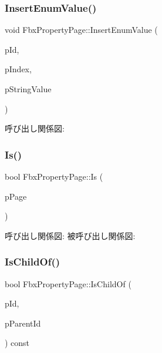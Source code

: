\subsubsection{\texorpdfstring{Insert\+Enum\+Value()}{InsertEnumValue()}}
{\footnotesize\ttfamily void Fbx\+Property\+Page\+::\+Insert\+Enum\+Value (\begin{DoxyParamCaption}\item[{\hyperlink{fbxtypes_8h_a088fa96de3b0b3ea69f0f6afef525dfb}{Fbx\+Int}}]{p\+Id,  }\item[{int}]{p\+Index,  }\item[{const char $\ast$}]{p\+String\+Value }\end{DoxyParamCaption})}

呼び出し関係図\+:
\mbox{\label{class_fbx_property_page_a8bc4d86023cb4e9d067e2d99c9911e7f}} 
\subsubsection{\texorpdfstring{Is()}{Is()}}
{\footnotesize\ttfamily bool Fbx\+Property\+Page\+::\+Is (\begin{DoxyParamCaption}\item[{\hyperlink{class_fbx_property_page}{Fbx\+Property\+Page} $\ast$}]{p\+Page }\end{DoxyParamCaption})\hspace{0.3cm}{\ttfamily [protected]}}

呼び出し関係図\+:
被呼び出し関係図\+:
\mbox{\label{class_fbx_property_page_af75c2b5ead47c26024b0f0bc6a537a9a}} 
\subsubsection{\texorpdfstring{Is\+Child\+Of()}{IsChildOf()}}
{\footnotesize\ttfamily bool Fbx\+Property\+Page\+::\+Is\+Child\+Of (\begin{DoxyParamCaption}\item[{\hyperlink{fbxtypes_8h_a088fa96de3b0b3ea69f0f6afef525dfb}{Fbx\+Int}}]{p\+Id,  }\item[{\hyperlink{fbxtypes_8h_a088fa96de3b0b3ea69f0f6afef525dfb}{Fbx\+Int}}]{p\+Parent\+Id }\end{DoxyParamCaption}) const}

